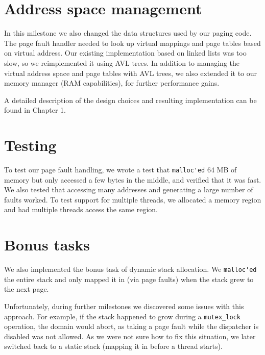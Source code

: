 \section{Address space management}

In this milestone we also changed the data structures used by our paging code.
The page fault handler needed to look up virtual mappings and page tables based on virtual address.
Our existing implementation based on linked lists was too slow, so we reimplemented it using AVL trees.
In addition to managing the virtual address space and page tables with AVL trees, we also extended it to our memory manager (RAM capabilities), for further performance gains.

A detailed description of the design choices and resulting implementation can be found in Chapter 1.


\section{Testing}

To test our page fault handling, we wrote a test that \verb|malloc'ed| 64 MB of memory but only accessed a few bytes in the middle, and verified that it was fast.
We also tested that accessing many addresses and generating a large number of faults worked.
To test support for multiple threads, we allocated a memory region and had multiple threads access the same region.


\section{Bonus tasks}

We also implemented the bonus task of dynamic stack allocation.
We \verb|malloc'ed| the entire stack and only mapped it in (via page faults) when the stack grew to the next page.

Unfortunately, during further milestones we discovered some issues with this approach.
For example, if the stack happened to grow during a \verb|mutex_lock| operation, the domain would abort, as taking a page fault while the dispatcher is disabled was not allowed.
As we were not sure how to fix this situation, we later switched back to a static stack (mapping it in before a thread starts).


